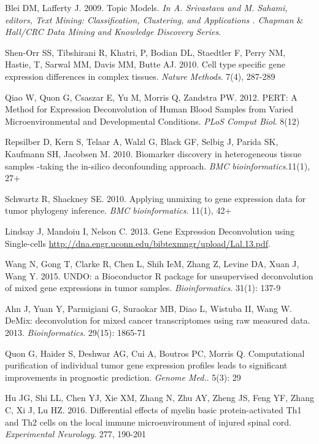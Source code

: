 \documentclass[10pt,letterpaper]{article}
\begin{document}
\begin{thebibliography}{9}
Blei DM, Lafferty J. 2009.
Topic Models.
\textit{In A. Srivastava and M. Sahami, editors, Text Mining: Classification, Clustering, and Applications . Chapman $\&$ Hall/CRC Data Mining and Knowledge Discovery Series}.

 Shen-Orr SS,  Tibshirani R,   Khatri, P,  Bodian DL,  Staedtler F,  Perry NM,  Hastie, T,   Sarwal MM,  Davis MM,  Butte AJ. 2010.
 Cell type specific gene expression   differences   in   complex   tissues.
 \textit{Nature   Methods}.  7(4),   287-289

Qiao W,  Quon G, Csaszar E, Yu  M,  Morris Q,  Zandstra  PW. 2012.
PERT: A   Method   for   Expression   Deconvolution   of   Human   Blood   Samples   from   Varied
Microenvironmental   and   Developmental   Conditions.
\textit{PLoS   Comput   Biol}.  8(12)

 Repsilber D,  Kern S,  Telaar A,  Walzl G,  Black GF,   Selbig   J,   Parida  SK,  Kaufmann SH,  Jacobsen M. 2010.
 Biomarker discovery in heterogeneous tissue samples -taking the in-silico deconfounding approach.
 \textit{BMC bioinformatics}.11(1), 27+

 Schwartz R, Shackney SE. 2010.
 Applying unmixing to gene expression data for tumor phylogeny inference.
 \textit{BMC bioinformatics}.  11(1), 42+

 Lindsay J,  Mandoiu I, Nelson C. 2013.
 Gene Expression Deconvolution using Single-cells
 \url{http://dna.engr.uconn.edu/bibtexmngr/upload/Lal.13.pdf}.

 Wang N, Gong T, Clarke R, Chen L, Shih IeM, Zhang Z, Levine DA, Xuan J, Wang Y.  2015.
 UNDO: a Bioconductor R package for unsupervised deconvolution of mixed gene expressions in tumor samples.
\textit{Bioinformatics}. 31(1): 137-9

Ahn J, Yuan Y, Parmigiani G, Suraokar MB, Diao L, Wistuba II, Wang W.
DeMix: deconvolution for mixed cancer transcriptomes using raw measured data. 2013.
\textit{Bioinformatics}. 29(15): 1865-71

Quon G, Haider S, Deshwar AG, Cui A, Boutros PC, Morris Q.
Computational purification of individual tumor gene expression profiles leads to significant improvements in prognostic prediction.
\textit{Genome Med.}. 5(3): 29


 Hu JG,  Shi LL,  Chen YJ,  Xie XM,  Zhang N,  Zhu AY,  Zheng JS,  Feng YF,  Zhang C,  Xi J,  Lu HZ. 2016.
 Differential effects of myelin basic protein-activated Th1 and Th2 cells on the local immune microenvironment of injured spinal cord.
 \textit{Experimental Neurology}. 277, 190-201


\end{thebibliography}
\end{document}
